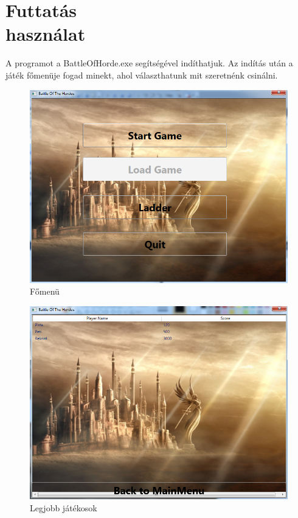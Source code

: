 \documentclass[a4paper,12pt]{report}
\begin{document}
\section{Futtatás\\használat}

A programot a BattleOfHorde.exe segítségével indíthatjuk. Az indítás után a játék főmenüje fogad minekt, ahol választhatunk mit szeretnénk csinálni.
\begin{figure}[hbtp]
\centering
\includegraphics[width=1\textwidth]{mainmenu.png}
\caption{Főmenü}
\label{fig:fmmm}
\end{figure}

\begin{figure}[hbtp]
\centering
\includegraphics[width=1\textwidth]{ladder.png}
\caption{Legjobb játékosok}
\label{fig:lj}
\end{figure}
\end{document}
